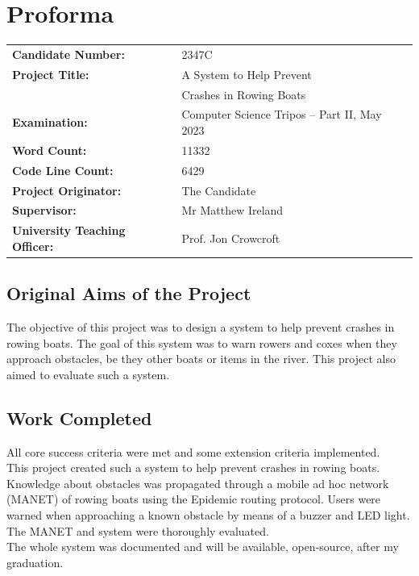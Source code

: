 \documentclass[12pt,a4paper]{report}
\begin{document}
\chapter*{Proforma}

{\large
\begin{tabular}{ll}
\bf Candidate Number:   & 2347C \\
\bf Project Title:  & A System to Help Prevent \\
& Crashes in Rowing Boats \\
\bf Examination:  & Computer Science Tripos -- Part II, May 2023      \\
\bf Word Count:    & 11332 \footnotemark[1]   \\
\bf Code Line Count:    & 6429 \footnotemark[2] \\ 
\bf Project Originator: & The Candidate     \\
\bf Supervisor:   & Mr Matthew Ireland  \\ 
\bf University Teaching Officer:  & Prof. Jon Crowcroft \\ 
\end{tabular}
}


\section*{Original Aims of the Project}
The objective of this project was to design a system to help prevent crashes in rowing boats. The goal of this system was to warn rowers and coxes when they approach obstacles, be they other boats or items in the river. This project also aimed to evaluate such a system.

\section*{Work Completed}
All core success criteria were met and some extension criteria implemented. \\ 
This project created such a system to help prevent crashes in rowing boats. Knowledge about obstacles was propagated through a mobile ad hoc network (MANET) of rowing boats using the Epidemic routing protocol. Users were warned when approaching a known obstacle by means of a buzzer and LED light. The MANET and system were thoroughly evaluated. \\
The whole system was documented and will be available, open-source, after my graduation. \\ 
\end{document}

